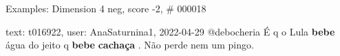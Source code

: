 \begin{frame}{Examples: Dimension 4 neg, score -2, \# 000018}
\footnotesize
\begin{alertblock}{text: t016922, user: AnaSaturnina1, 2022-04-29}
@debocheria É q o Lula \textbf{bebe} água do jeito q \textbf{bebe} 
\textbf{cachaça} . Não perde nem um pingo. 
\end{alertblock}
\end{frame}

